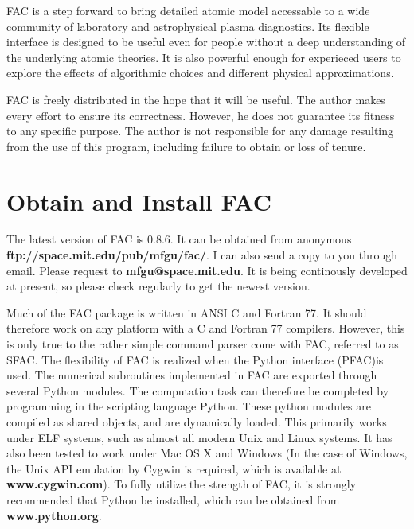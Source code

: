 \documentclass[twoside,letterpaper]{refrep}
\newcommand{\facversion}{{0.8.6}\xspace}
\begin{document}
FAC is a step forward to bring detailed atomic model accessable to a wide
community of laboratory and astrophysical plasma diagnostics. Its flexible
interface is designed to be useful even for people without a deep
understanding of the underlying atomic theories. It is also powerful enough
for experieced users to explore the effects of algorithmic choices and
different physical approximations.

FAC is freely distributed in the hope that it will be useful. The author makes
every effort to ensure its correctness. However, he does not guarantee its
fitness to any specific purpose. The author is not responsible for any damage
resulting from the use of this program, including failure to obtain or loss of
tenure. 

\section{Obtain and Install FAC}
\label{sec:install}
The latest version of FAC is \facversion. It can be obtained from anonymous
\textbf{ftp://space.mit.edu/pub/mfgu/fac/}. I can also send a copy to you
through email. Please request to \textbf{mfgu@space.mit.edu}. It is being
continously developed at present, so please check regularly to get the newest
version.

Much of the FAC package is written in ANSI C and Fortran 77. It should 
therefore work on any platform with a C and Fortran 77 compilers. However, 
this is only true to the rather simple command parser come with FAC, referred 
to as SFAC. The flexibility of FAC is realized when the Python interface
(PFAC)is used. The numerical subroutines implemented in FAC are exported
through several Python modules. The computation task can therefore be
completed by programming in the scripting language Python. These python
modules are compiled as shared objects, and are dynamically loaded. This
primarily works under ELF systems, such as almost all modern Unix and Linux
systems. It has also been tested to work under Mac OS X and Windows (In the
case of Windows, the Unix API emulation by Cygwin is required, which is
available at \textbf{www.cygwin.com}). To fully utilize the strength of  
FAC, it is strongly recommended that Python be installed, which can be obtained
from \textbf{www.python.org}.
\end{document}
